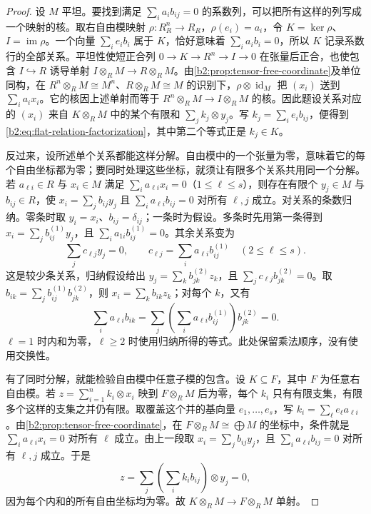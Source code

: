 \begin{proof}
	设 \(M\) 平坦。要找到满足 \(\sum_i a_i b_{ij}=0\) 的系数列，可以把所有这样的列写成一个映射的核。取右自由模映射 \(\rho:R_R^n\to R_R\)，\(\rho(e_i)=a_i\)，令 \(K=\ker\rho\)、\(I=\operatorname{im}\rho\)。一个向量 \(\sum_i e_i b_i\) 属于 \(K\)，恰好意味着 \(\sum_i a_i b_i=0\)，所以 \(K\) 记录系数行的全部关系。平坦性使短正合列 \(0\to K\to R^n\to I\to0\) 在张量后正合，也使包含 \(I\hookrightarrow R\) 诱导单射 \(I\otimes_RM\to R\otimes_RM\)。由\cref{b2:prop:tensor-free-coordinate}及单位同构，在 \(R^n\otimes_RM\cong M^n\)、\(R\otimes_RM\cong M\) 的识别下，\(\rho\otimes\operatorname{id}_M\) 把 \((x_i)\) 送到 \(\sum_i a_ix_i\)。它的核因上述单射而等于 \(R^n\otimes_RM\to I\otimes_RM\) 的核。因此题设关系对应的 \((x_i)\) 来自 \(K\otimes_RM\) 中的某个有限和 \(\sum_j k_j\otimes y_j\)。写 \(k_j=\sum_i e_i b_{ij}\)，便得到 \eqref{b2:eq:flat-relation-factorization}，其中第二个等式正是 \(k_j\in K\)。

	反过来，设所述单个关系都能这样分解。自由模中的一个张量为零，意味着它的每个自由坐标都为零；要同时处理这些坐标，就须让有限多个关系共用同一个分解。若 \(a_{\ell i}\in R\) 与 \(x_i\in M\) 满足 \(\sum_i a_{\ell i}x_i=0\)（\(1\le\ell\le s\)），则存在有限个 \(y_j\in M\) 与 \(b_{ij}\in R\)，使 \(x_i=\sum_jb_{ij}y_j\) 且 \(\sum_i a_{\ell i}b_{ij}=0\) 对所有 \(\ell,j\) 成立。对关系的条数归纳。零条时取 \(y_i=x_i\)、\(b_{ij}=\delta_{ij}\)；一条时为假设。多条时先用第一条得到 \(x_i=\sum_jb^{(1)}_{ij}y_j\)，且 \(\sum_i a_{1i}b^{(1)}_{ij}=0\)。其余关系变为
	\[
		\sum_j c_{\ell j}y_j=0, \qquad c_{\ell j}=\sum_i a_{\ell i}b^{(1)}_{ij} \quad(2\le\ell\le s).
	\]
	这是较少条关系，归纳假设给出 \(y_j=\sum_kb^{(2)}_{jk}z_k\)，且 \(\sum_jc_{\ell j}b^{(2)}_{jk}=0\)。取 \(b_{ik}=\sum_jb^{(1)}_{ij}b^{(2)}_{jk}\)，则 \(x_i=\sum_kb_{ik}z_k\)；对每个 \(k\)，又有
	\[
		\sum_i a_{\ell i}b_{ik} =\sum_j\left(\sum_i a_{\ell i}b^{(1)}_{ij}\right)b^{(2)}_{jk}=0.
	\]
	\(\ell=1\) 时内和为零，\(\ell\ge2\) 时使用归纳所得的等式。此处保留乘法顺序，没有使用交换性。

	有了同时分解，就能检验自由模中任意子模的包含。设 \(K\subseteq F\)，其中 \(F\) 为任意右自由模。若 \(z=\sum_{i=1}^n k_i\otimes x_i\) 映到 \(F\otimes_RM\) 后为零，每个 \(k_i\) 只有有限支集，有限多个这样的支集之并仍有限。取覆盖这个并的基向量 \(e_1,\ldots,e_s\)，写 \(k_i=\sum_\ell e_\ell a_{\ell i}\)。由\cref{b2:prop:tensor-free-coordinate}，在 \(F\otimes_RM\cong\bigoplus M\) 的坐标中，条件就是 \(\sum_i a_{\ell i}x_i=0\) 对所有 \(\ell\) 成立。由上一段取 \(x_i=\sum_jb_{ij}y_j\)，且 \(\sum_i a_{\ell i}b_{ij}=0\) 对所有 \(\ell,j\) 成立。于是
	\[
		z=\sum_j\left(\sum_i k_i b_{ij}\right)\otimes y_j=0,
	\]
	因为每个内和的所有自由坐标均为零。故 \(K\otimes_R M\to F\otimes_R M\) 单射。


\end{proof}
